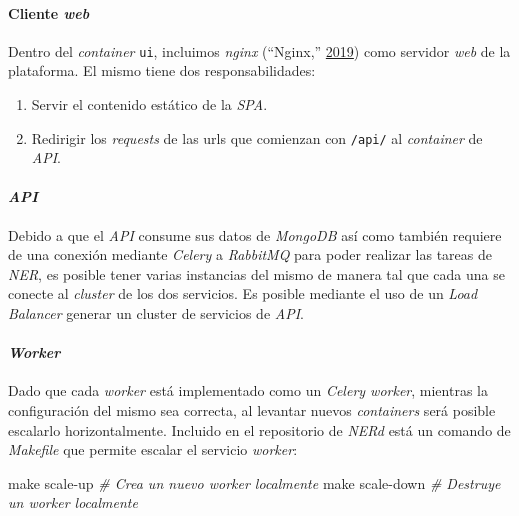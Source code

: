 \documentclass[12pt,a4paper,]{scrartcl}
\newenvironment{Shaded}{\begin{snugshade}}{\end{snugshade}}
\newcommand{\CommentTok}[1]{\textcolor[rgb]{0.56,0.35,0.01}{\textit{#1}}}
\newcommand{\FunctionTok}[1]{\textcolor[rgb]{0.00,0.00,0.00}{#1}}
\newcommand{\NormalTok}[1]{#1}
\providecommand{\tightlist}{%
  \setlength{\itemsep}{0pt}\setlength{\parskip}{0pt}}
\let\oldparagraph\paragraph
\renewcommand{\paragraph}[1]{\oldparagraph{#1}\mbox{}}
\begin{document}
\hypertarget{cliente-web-2}{%
\paragraph{\texorpdfstring{Cliente \emph{web}}{Cliente web}}\label{cliente-web-2}}

Dentro del \emph{container} \texttt{ui}, incluimos \emph{nginx} (``Nginx,'' \protect\hyperlink{ref-nginx}{2019}) como servidor \emph{web} de la plataforma. El mismo tiene dos responsabilidades:

\begin{enumerate}
\def\labelenumi{\arabic{enumi}.}
\tightlist
\item
  Servir el contenido estático de la \emph{SPA}.
\item
  Redirigir los \emph{requests} de las urls que comienzan con \texttt{/api/} al \emph{container} de \emph{API}.
\end{enumerate}

\hypertarget{api-3}{%
\paragraph{\texorpdfstring{\emph{API}}{API}}\label{api-3}}

Debido a que el \emph{API} consume sus datos de \emph{MongoDB} así como también requiere de una conexión mediante \emph{Celery} a \emph{RabbitMQ} para poder realizar las tareas de \emph{NER}, es posible tener varias instancias del mismo de manera tal que cada una se conecte al \emph{cluster} de los dos servicios. Es posible mediante el uso de un \emph{Load Balancer} generar un cluster de servicios de \emph{API}.

\hypertarget{worker-2}{%
\paragraph{\texorpdfstring{\emph{Worker}}{Worker}}\label{worker-2}}

Dado que cada \emph{worker} está implementado como un \emph{Celery worker}, mientras la configuración del mismo sea correcta, al levantar nuevos \emph{containers} será posible escalarlo horizontalmente. Incluido en el repositorio de \emph{NERd} está un comando de \emph{Makefile} que permite escalar el servicio \emph{worker}:

\begin{Shaded}
\begin{Highlighting}[]
\FunctionTok{make}\NormalTok{ scale-up }\CommentTok{# Crea un nuevo worker localmente}
\FunctionTok{make}\NormalTok{ scale-down }\CommentTok{# Destruye un worker localmente}
\end{Highlighting}
\end{Shaded}
\end{document}
